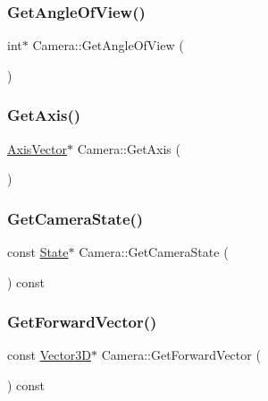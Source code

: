 \subsubsection{\texorpdfstring{Get\+Angle\+Of\+View()}{GetAngleOfView()}}
{\footnotesize\ttfamily int$\ast$ Camera\+::\+Get\+Angle\+Of\+View (\begin{DoxyParamCaption}{ }\end{DoxyParamCaption})\hspace{0.3cm}{\ttfamily [inline]}}

\mbox{\label{class_camera_a62c4371143e87e34c70d27f2728987d9}} 
\subsubsection{\texorpdfstring{Get\+Axis()}{GetAxis()}}
{\footnotesize\ttfamily \mbox{\hyperlink{class_axis_vector}{Axis\+Vector}}$\ast$ Camera\+::\+Get\+Axis (\begin{DoxyParamCaption}{ }\end{DoxyParamCaption})\hspace{0.3cm}{\ttfamily [inline]}}

\mbox{\label{class_camera_a47e72bd04f7aaac1657d7bce5322b97c}} 
\subsubsection{\texorpdfstring{Get\+Camera\+State()}{GetCameraState()}}
{\footnotesize\ttfamily const \mbox{\hyperlink{class_camera_1_1_state}{State}}$\ast$ Camera\+::\+Get\+Camera\+State (\begin{DoxyParamCaption}{ }\end{DoxyParamCaption}) const\hspace{0.3cm}{\ttfamily [inline]}}

\mbox{\label{class_camera_aec9441c5c1924df0a0cacbcf28c839e2}} 
\subsubsection{\texorpdfstring{Get\+Forward\+Vector()}{GetForwardVector()}}
{\footnotesize\ttfamily const \mbox{\hyperlink{class_vector3_d}{Vector3D}}$\ast$ Camera\+::\+Get\+Forward\+Vector (\begin{DoxyParamCaption}{ }\end{DoxyParamCaption}) const\hspace{0.3cm}{\ttfamily [inline]}}


